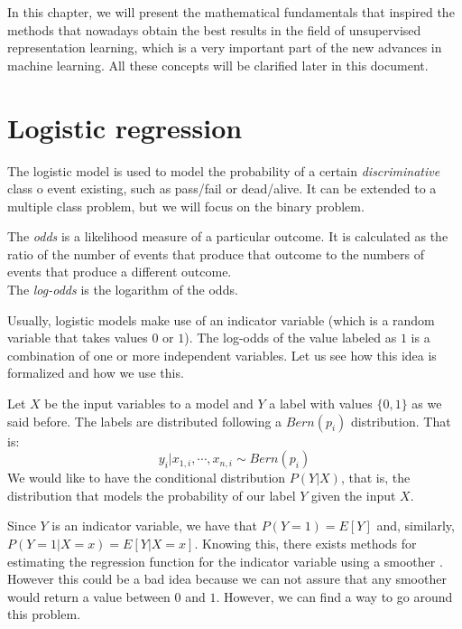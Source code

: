

\label{Chapter:NCE}

In this chapter, we will present the mathematical fundamentals that inspired the methods that nowadays obtain the best results in the field of unsupervised representation learning, which is a very important part of the new advances in machine learning. All these concepts will be clarified later in this document.

\section{Logistic regression}

The logistic model is used to model the probability of a certain \emph{discriminative} class o event existing, such as pass/fail or dead/alive. It can be extended to a multiple class problem, but we will focus on the binary problem.

\begin{ndef}
The \emph{odds} is a likelihood measure of a particular outcome. It is calculated as the ratio of the number of events that produce that outcome to the numbers of events that produce a different outcome.\\

The \emph{log-odds} is the logarithm of the odds.
\end{ndef}

Usually, logistic models make use of an indicator variable (which is a random variable that takes values $0$ or $1$). The log-odds of the value labeled as $1$ is a combination of one or more independent variables. Let us see how this idea is formalized and how we use this.

Let $X$ be the input variables to a model and $Y$ a label with values $\{0,1\}$ as we said before. The labels are distributed following a $Bern(p_i)$ distribution. That is:
\[
y_i | x_{1,i},\cdots,x_{n,i} \sim Bern(p_i)    
\]
We would like to have the conditional distribution $P(Y|X)$, that is, the distribution that models the probability of our label $Y$ given the input $X$. 


Since $Y$ is an indicator variable, we have that $P(Y=1) = E[Y]$ and, similarly, $P(Y = 1 | X = x) = E[Y | X = x]$. Knowing this,  there exists methods for estimating the regression function for the indicator variable using a smoother \citep{cosma_advanced}. However this could be a bad idea because we can not assure that any smoother would return a value between $0$ and $1$. However, we can find a way to go around this problem.

